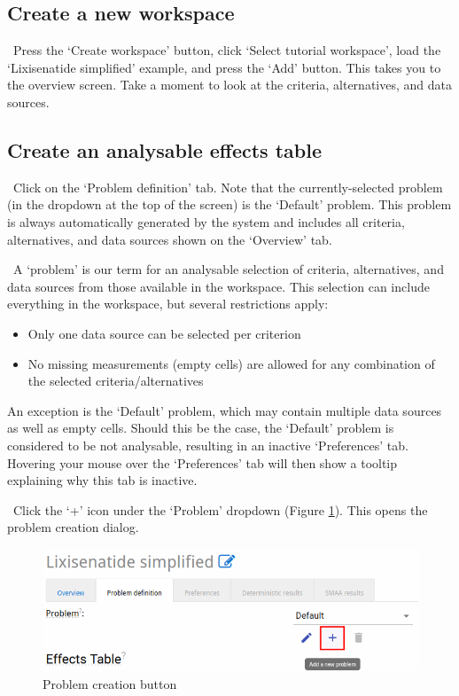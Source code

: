 \documentclass[00_mcda_tutorial.tex]{subfiles}
\begin{document}
\subsection*{Create a new workspace}
\leftpointright \, Press the ‘Create workspace’ button, click ‘Select tutorial workspace’, load the ‘Lixisenatide simplified’ example, and press the ‘Add’ button. This takes you to the overview screen. Take a moment to look at the criteria, alternatives, and data sources.

\subsection*{Create an analysable effects table}
\leftpointright \, Click on the ‘Problem definition’ tab. Note that the currently-selected problem (in the dropdown at the top of the screen) is the ‘Default’ problem. This problem is always automatically generated by the system and includes all criteria, alternatives, and data sources shown on the ‘Overview’ tab.
\newline

\noindent \faGraduationCap \, A ‘problem’ is our term for an analysable selection of criteria, alternatives, and data sources from those available in the workspace. This selection can include everything in the workspace, but several restrictions apply:

\begin{itemize}
    \item Only one data source can be selected per criterion
    \item No missing measurements (empty cells) are allowed for any combination of the selected criteria/alternatives
\end{itemize}

\noindent An exception is the ‘Default’ problem, which may contain multiple data sources as well as empty cells. Should this be the case, the ‘Default’ problem is considered to be not analysable, resulting in an inactive ‘Preferences’ tab. Hovering your mouse over the ‘Preferences’ tab will then show a tooltip explaining why this tab is inactive.

\noindent \leftpointright \, Click the ‘+’ icon under the ‘Problem’ dropdown (Figure \ref{fig:create_problem}). This opens the problem creation dialog.

\begin{figure}[!h]
    \centering
    \includegraphics[width=.8\textwidth]{fig/createProblem.png}
    \caption{Problem creation button}
    \label{fig:create_problem}
\end{figure}
\end{document}
